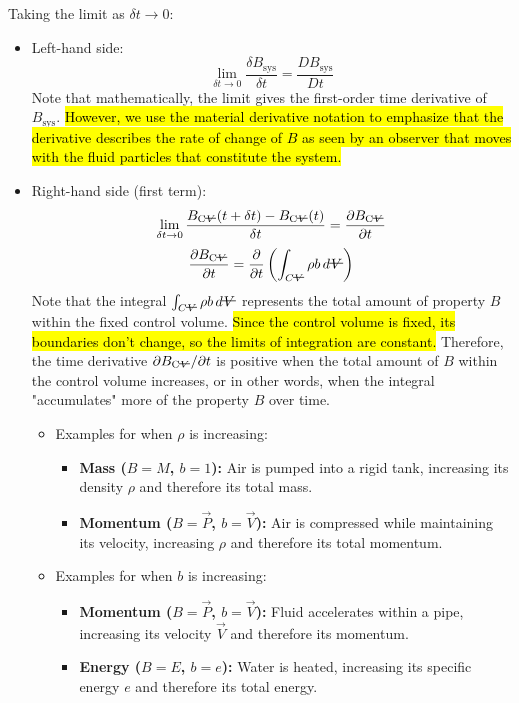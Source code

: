 ﻿\documentclass[12pt]{article}
\newcommand{\vol}{\mathord{\text{\ooalign{\hidewidth $V$\hidewidth\cr\kern-0.5pt\raisebox{0.8ex}{\rule[0pt]{1em}{0.5pt}}}}}}
\begin{document}
\newpage
Taking the limit as $\delta t \to 0$:
\begin{itemize}
    \item Left-hand side:
    \[\lim_{\delta t \to 0} \frac{\delta B_{\mathrm{sys}}}{\delta t} = \frac{DB_{\mathrm{sys}}}{Dt}\]
    Note that mathematically, the limit gives the first-order time derivative of $B_{\mathrm{sys}}$. \hl{However, we use the material derivative notation to emphasize that the derivative describes the rate of change of $B$ as seen by an observer that moves with the fluid particles that constitute the system.}
    \item Right-hand side (first term):
    \[
\lim_{\delta t \to 0}\frac{B_{\mathrm{C\vol}}(t+\delta t)-B_{\mathrm{C\vol}}(t)}{\delta t}=\frac{\partial B_{\mathrm{C\vol}}}{\partial t}
\]
\[\frac{\partial B_{\mathrm{C\vol}}}{\partial t} = \frac{\partial}{\partial t}\left(\int_{C\vol} \rho b\, d\vol\right)\]
Note that the integral $\int_{C\vol} \rho b\, d\vol$ represents the total amount of property $B$ within the fixed control volume. \hl{Since the control volume is fixed, its boundaries don't change, so the limits of integration are constant.} Therefore, the time derivative $\partial B_{\mathrm{C\vol}}/\partial t$ is positive when the total amount of $B$ within the control volume increases, or in other words, when the integral "accumulates" more of the property $B$ over time.
\begin{examplebox}
\begin{itemize}
    \item Examples for when $\rho$ is increasing:
    \begin{itemize}
        \item \textbf{Mass ($B=M$, $b=1$):} Air is pumped into a rigid tank, increasing its density $\rho$ and therefore its total mass.
        \item \textbf{Momentum ($B=\vec{P}$, $b=\vec{V}$):} Air is compressed while maintaining its velocity, increasing $\rho$ and therefore its total momentum.
    \end{itemize}

    \item Examples for when $b$ is increasing:
    \begin{itemize}
        \item \textbf{Momentum ($B=\vec{P}$, $b=\vec{V}$):} Fluid accelerates within a pipe, increasing its velocity $\vec{V}$ and therefore its momentum.
        \item \textbf{Energy ($B=E$, $b=e$):} Water is heated, increasing its specific energy $e$ and therefore its total energy.
    \end{itemize}


\end{itemize}
\end{examplebox}
\end{itemize}
\end{document}
